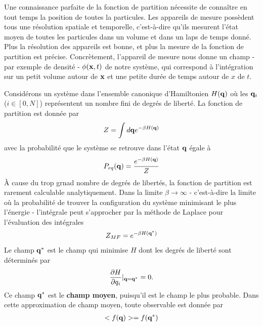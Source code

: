 Une connaissance parfaite de la fonction de partition nécessite de connaître en tout temps la position de toutes la particules. Les appareils de mesure possèdent tous une résolution spatiale et temporelle, c'est-à-dire qu'ils mesurent l'état moyen de toutes les particules dans un volume et dans un laps de temps donné. Plus la résolution des appareils est bonne, et plus la mesure de la fonction de partition est précise. 
Concrètement, l'appareil de mesure nous donne un champ - par exemple de densité - $\phi({\bf x},t)$ de notre système, qui correspond à l'intégration sur un petit volume autour de ${\bf x}$ et une petite durée de temps autour de $x$ de $t$. 

Considérons un système dans l'ensemble canonique d'Hamiltonien  $H({\bf q})$ où les ${\bf q}_i$ ($i \in [0,N]$) représentent un nombre fini de degrés de liberté. La fonction de partition est donnée par 
\begin{align}
    Z = \int d{\bf q} e^{-\beta H({\bf q})}
\end{align}
avec la probabilité que le système se retrouve dans l'état ${\bf q}$ égale à
\begin{align}
    P_{eq}({\bf q}) = \frac{e^{-\beta H({\bf q})}}{Z}
    \label{eqdis}
\end{align}
À cause du trop grnad nombre de degrés de libertés, la fonction de partition est rarement calculable analytiquement. Dans la limite $\beta \to \infty$ - c'est-à-dire la limite où la probabilité de trouver la configuration du système minimisant le plus l'énergie - l'intégrale peut s'approcher par la méthode de Laplace pour l'évaluation des intégrales 
\begin{align}
    Z_{MF}= e^{-\beta H({\bf q}^*)}
\end{align}
Le champ ${\bf q}^*$ est le champ qui minimise $H$ dont les degrés de liberté sont déterminés par
\begin{align}
    \frac{\partial H}{\partial q_i}|_{{\bf q}={\bf q^*}}=0.
\end{align}
Ce champ ${\bf q}^*$ est le \textbf{champ moyen}, puisqu'il est le champ le plus probable. Dans cette approximation de champ moyen, toute observable est donnée par
\begin{align}
    < f({\bf q}) > = f({\bf q}^*)
\end{align}

